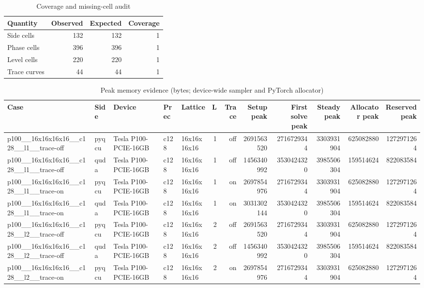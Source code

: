 \begin{table}[htbp]
\centering
\caption{Coverage and missing-cell audit}
\small
\begin{tabular}{@{}lrrr@{}}
\toprule
Quantity & Observed & Expected & Coverage \\
\midrule
Side cells & 132 & 132 & 1 \\
Phase cells & 396 & 396 & 1 \\
Level cells & 220 & 220 & 1 \\
Trace curves & 44 & 44 & 1 \\
\bottomrule
\end{tabular}
\end{table}

\begin{table}[htbp]
\centering
\caption{Peak memory evidence (bytes; device-wide sampler and PyTorch allocator)}
\small
\begin{tabular}{@{}lllllrrrrrrr@{}}
\toprule
Case & Side & Device & Prec & Lattice & L & Trace & Setup peak & First solve peak & Steady peak & Allocator peak & Reserved peak \\
\midrule
p100\_\_16x16x16x16\_\_c128\_\_l1\_\_trace-off & pyqcu & Tesla P100-PCIE-16GB & c128 & 16x16x16x16 & 1 & off & 2691563520 & 2716729344 & 3303931904 & 625082880 & 1272971264 \\
p100\_\_16x16x16x16\_\_c128\_\_l1\_\_trace-off & quda & Tesla P100-PCIE-16GB & c128 & 16x16x16x16 & 1 & off & 1456340992 & 3530424320 & 3985506304 & 159514624 & 822083584 \\
p100\_\_16x16x16x16\_\_c128\_\_l1\_\_trace-on & pyqcu & Tesla P100-PCIE-16GB & c128 & 16x16x16x16 & 1 & on & 2697854976 & 2716729344 & 3303931904 & 625082880 & 1272971264 \\
p100\_\_16x16x16x16\_\_c128\_\_l1\_\_trace-on & quda & Tesla P100-PCIE-16GB & c128 & 16x16x16x16 & 1 & on & 3031302144 & 3530424320 & 3985506304 & 159514624 & 822083584 \\
p100\_\_16x16x16x16\_\_c128\_\_l2\_\_trace-off & pyqcu & Tesla P100-PCIE-16GB & c128 & 16x16x16x16 & 2 & off & 2691563520 & 2716729344 & 3303931904 & 625082880 & 1272971264 \\
p100\_\_16x16x16x16\_\_c128\_\_l2\_\_trace-off & quda & Tesla P100-PCIE-16GB & c128 & 16x16x16x16 & 2 & off & 1456340992 & 3530424320 & 3985506304 & 159514624 & 822083584 \\
p100\_\_16x16x16x16\_\_c128\_\_l2\_\_trace-on & pyqcu & Tesla P100-PCIE-16GB & c128 & 16x16x16x16 & 2 & on & 2697854976 & 2716729344 & 3303931904 & 625082880 & 1272971264 \\

\end{tabular}
\end{table}
